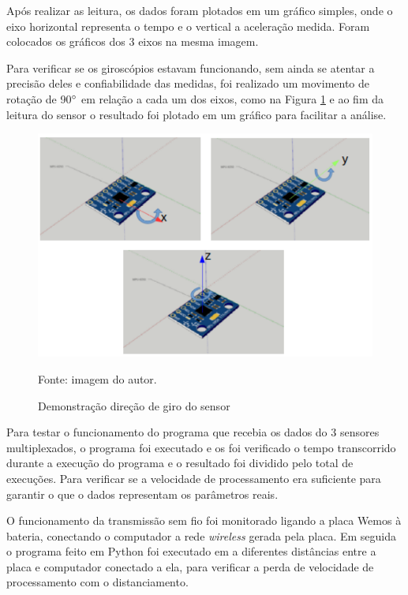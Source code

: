 	Após realizar as leitura, os dados foram plotados em um gráfico simples, onde o eixo horizontal representa o tempo e o vertical a aceleração medida. Foram colocados os gráficos dos 3 eixos na mesma imagem. 
	
	Para verificar se os giroscópios estavam funcionando, sem ainda se atentar a precisão deles e confiabilidade das medidas, foi realizado um movimento de rotação de 90$ \degree $ em relação a cada um dos eixos, como na Figura \ref{validacao_giro}  e ao fim da leitura do sensor o resultado foi plotado em um gráfico para facilitar a análise.
	
	\begin{figure}[h]
		\centering
		\includegraphics[keepaspectratio=true,scale=0.55]{figuras/validacao_giro.png}
		\caption{Demonstração direção de giro do sensor}
		Fonte: imagem do autor. 
		\label{validacao_giro}	
	\end{figure}
	
	Para testar o funcionamento do programa que recebia os dados do 3 sensores multiplexados, o programa foi executado e os foi verificado o tempo transcorrido durante a execução do programa e o resultado foi dividido pelo total de execuções. Para verificar se a velocidade de processamento era suficiente para garantir o que o dados representam os parâmetros reais.
	
	O funcionamento da transmissão sem fio foi monitorado ligando a placa Wemos à bateria, conectando o computador a rede \textit{wireless} gerada pela placa. Em seguida o programa feito em Python foi executado em a diferentes distâncias entre a placa e computador conectado a ela, para verificar a perda de velocidade de processamento com o distanciamento.
	
